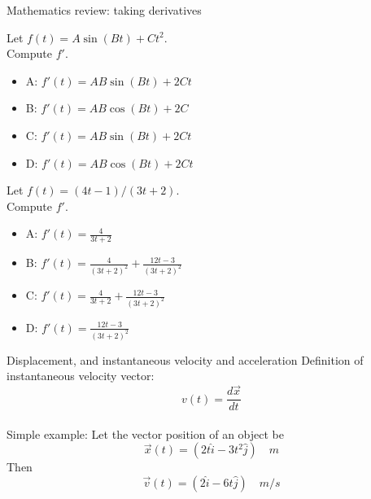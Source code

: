 \documentclass{beamer}
\begin{document}
\begin{frame}{Mathematics review: taking derivatives}
\small
\begin{minipage}[b]{0.45\linewidth}
Let $f(t) = A\sin(Bt) + Ct^2$.  \\ Compute $f'$. \\
\vspace{0.2cm}
\begin{itemize}
\item A: $f'(t) = AB\sin(Bt) + 2Ct$
\item B: $f'(t) = AB\cos(Bt) + 2C$
\item C: $f'(t) = AB\sin(Bt) + 2Ct$
\item D: $f'(t) = AB\cos(Bt) + 2Ct$
\end{itemize}
\end{minipage}
\hspace{0.5cm}
\begin{minipage}[b]{0.45\linewidth}
Let $f(t) = (4t-1)/(3t+2)$.  \\ Compute $f'$. \\
\begin{itemize}
\item A: $f'(t) = \frac{4}{3t+2}$
\item B: $f'(t) = \frac{4}{(3t+2)^2}+\frac{12t-3}{(3t+2)^2}$
\item C: $f'(t) = \frac{4}{3t+2}+\frac{12t-3}{(3t+2)^2}$
\item D: $f'(t) = \frac{12t-3}{(3t+2)^2}$
\end{itemize}
\end{minipage}
\end{frame}

\begin{frame}{Displacement, and instantaneous velocity and acceleration}
Definition of instantaneous velocity vector:
\begin{equation}
\boxed{v(t) = \frac{d\vec{x}}{dt}}
\end{equation} \\
\vspace{0.5cm}
Simple example: Let the vector position of an object be
\begin{equation}
\vec{x}(t) = (2t \hat{i} - 3t^2\hat{j}) \quad m
\end{equation}
Then
\begin{equation}
\vec{v}(t) = (2 \hat{i} - 6t\hat{j}) \quad m/s
\end{equation}
\end{frame}
\end{document}

